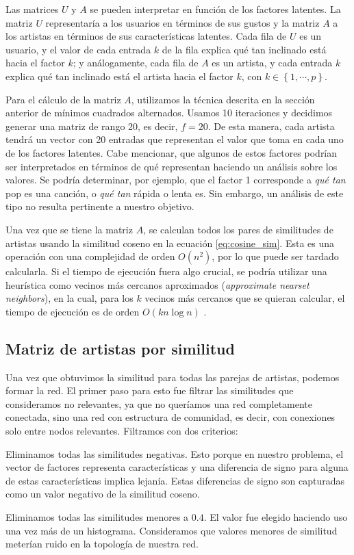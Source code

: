 \documentclass[conference]{IEEEtran}
\begin{document}
Las matrices $U$ y $A$ se pueden interpretar en función de los factores latentes. La matriz $U$ representaría a los usuarios en términos de sus gustos y la matriz $A$ a los artistas en términos de sus características latentes. Cada fila de $U$ es un usuario, y el valor de cada entrada $k$ de la fila explica qué tan inclinado está hacia el factor $k$; y análogamente, cada fila de $A$ es un artista, y cada entrada $k$ explica qué tan inclinado está el artista hacia el factor $k$, con $k \in \left\{1, \cdots, p \right\}$.

Para el cálculo de la matriz $A$, utilizamos la técnica descrita en la sección anterior de mínimos cuadrados alternados. Usamos 10 iteraciones y decidimos generar una matriz de rango 20, es decir, $f = 20$. De esta manera, cada artista tendrá un vector con 20 entradas que representan el valor que toma en cada uno de los factores latentes. Cabe mencionar, que algunos de estos factores podrían ser interpretados en términos de qué representan haciendo un análisis sobre los valores. Se podría determinar, por ejemplo, que el factor 1 corresponde a \textit{qué tan} pop es una canción, o \textit{qué tan} rápida o lenta es. Sin embargo, un análisis de este tipo no resulta pertinente a nuestro objetivo.

Una vez que se tiene la matriz $A$, se calculan todos los pares de similitudes de artistas usando la similitud coseno en la ecuación \ref{eq:cosine_sim}. Esta es una operación con una complejidad de orden $O(n^2)$, por lo que puede ser tardado calcularla. Si el tiempo de ejecución fuera algo crucial, se podría utilizar una heurística como vecinos más cercanos aproximados (\textit{approximate nearset neighbors}), en la cual, para los $k$ vecinos más cercanos que se quieran calcular, el tiempo de ejecución es de orden $O(kn \log{n})$ \cite{arya1994optimal}.

\subsection{Matriz de artistas por similitud}

Una vez que obtuvimos la similitud para todas las parejas de artistas, podemos formar la red. El primer paso para esto fue filtrar las similitudes que consideramos no relevantes, ya que no queríamos una red completamente conectada, sino una red con estructura de comunidad, es decir, con conexiones solo entre nodos relevantes. Filtramos con dos criterios:

\begin{compactenum}
    \item Eliminamos todas las similitudes negativas. Esto porque en nuestro problema, el vector de factores representa características y una diferencia de signo para alguna de estas características implica lejanía. Estas diferencias de signo son capturadas como un valor negativo de la similitud coseno.
    \item Eliminamos todas las similitudes menores a $0.4$. El valor fue elegido haciendo uso una vez más de un histograma. Consideramos que valores menores de similitud meterían ruido en la topología de nuestra red.
\end{compactenum}
\end{document}
